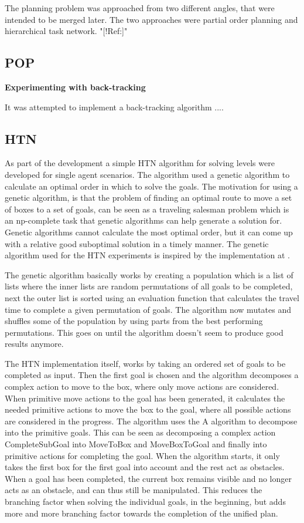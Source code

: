 \documentclass[Main]{subfiles}
\begin{document}
The planning problem was approached from two different angles, that were intended to be merged later. The two approaches were partial order planning and hierarchical task network. "[!Ref:]" 


\subsection{POP}

\textbf{Experimenting with back-tracking}

It was attempted to implement a back-tracking algorithm ....






\subsection{HTN}
As part of the development a simple HTN algorithm for solving levels were developed for single agent scenarios.
The algorithm used a genetic algorithm to calculate an optimal order in which to solve the goals.
The motivation for using a genetic algorithm, is that the problem of finding an optimal route to move a set of boxes to a set of goals, can be seen as a traveling salesman problem which is an np-complete task that genetic algorithms can help generate a solution for.
Genetic algorithms cannot calculate the most optimal order, but it can come up with a relative good suboptimal solution in a timely manner. The genetic algorithm used for the HTN experiments is inspired by the implementation at \cite{genetic}.

The genetic algorithm basically works by creating a population which is a list of lists where the inner lists are random permutations of all goals to be completed, next the outer list is sorted using an evaluation function that calculates the travel time to complete a given permutation of goals. The algorithm now mutates and shuffles some of the population by using parts from the best performing permutations. This goes on until the algorithm doesn't seem to produce good results anymore.

The HTN implementation itself, works by taking an ordered set of goals to be completed as input. Then the first goal is chosen and the algorithm decomposes a complex action to move to the box, where only move actions are considered. When primitive move actions to the goal has been generated, it calculates the needed primitive actions to move the box to the goal, where all possible actions are considered in the progress. The algorithm uses the A\* algorithm to decompose into the primitive goals.
This can be seen as decomposing a complex action CompleteSubGoal into MoveToBox and MoveBoxToGoal and finally into primitive actions for completing the goal.
When the algorithm starts, it only takes the first box for the first goal into account and the rest act as obstacles. When a goal has been completed, the current box remains visible and no longer acts as an obstacle, and can thus still be manipulated. This reduces the branching factor when solving the individual goals, in the beginning, but adds more and more branching factor towards the completion of the unified plan.
\end{document}

